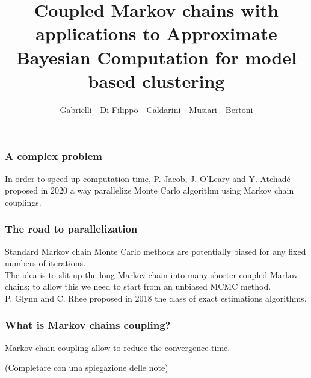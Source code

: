 \documentclass[9pt]{beamer}
\begin{document}
	\author{Gabrielli - Di Filippo - Caldarini - Musiari - Bertoni}
	\title{Coupled Markov chains with applications to Approximate Bayesian Computation for model based clustering}
	\begin{frame}[plain]
		\maketitle
	\end{frame}
	
	\begin{frame}
		\frametitle{A complex problem}
		
		In order to speed up computation time, P. Jacob, J. O'Leary and Y. Atchadé proposed in 2020 a way parallelize Monte Carlo algorithm using Markov chain couplings.
		
	\end{frame}

	\begin{frame}
		\frametitle{The road to parallelization}
		
		Standard Markov chain Monte Carlo methods are potentially biased for any fixed numbers of iterations.\\
		
		The idea is to slit up the long Markov chain into many shorter coupled Markov chains; to allow this we need to start from an unbiased MCMC method.\\
		
		P. Glynn and C. Rhee proposed in 2018 the class of exact estimations algorithms.\\
		
		
	\end{frame}
	
	\begin{frame}
		\frametitle{What is Markov chains coupling?}
		
		Markov chain coupling allow to reduce the convergence time.
		
		(Completare con una spiegazione delle note)
	\end{frame}
		
\end{document}
